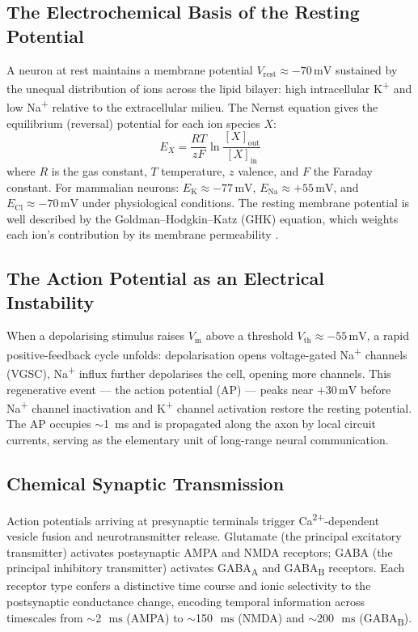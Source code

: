 \documentclass[11pt, a4paper, twocolumn]{article}
\newcommand{\Vm}{\ensuremath{V_{\mathrm{m}}}}
\newcommand{\Vrest}{\ensuremath{V_{\mathrm{rest}}}}
\newcommand{\Vth}{\ensuremath{V_{\mathrm{th}}}}
\newcommand{\EK}{\ensuremath{E_{\mathrm{K}}}}
\newcommand{\ENa}{\ensuremath{E_{\mathrm{Na}}}}
\newcommand{\ECl}{\ensuremath{E_{\mathrm{Cl}}}}
\newcommand{\mV}{\ensuremath{\,\mathrm{mV}}}
\newcommand{\ms}{\ensuremath{\,\mathrm{ms}}}
\begin{document}
\subsection{The Electrochemical Basis of the Resting Potential}

A neuron at rest maintains a membrane potential $\Vrest \approx -70\mV$
sustained by the unequal distribution of ions across the lipid bilayer:
high intracellular K\textsuperscript{+} and low Na\textsuperscript{+}
relative to the extracellular milieu. The Nernst equation gives the
equilibrium (reversal) potential for each ion species $X$:
\begin{equation}
  E_X = \frac{RT}{zF} \ln \frac{[X]_{\mathrm{out}}}{[X]_{\mathrm{in}}}
  \label{eq:nernst}
\end{equation}
where $R$ is the gas constant, $T$ temperature, $z$ valence, and $F$ the
Faraday constant. For mammalian neurons: $\EK \approx -77\mV$,
$\ENa \approx +55\mV$, and $\ECl \approx -70\mV$ under physiological conditions.
The resting membrane potential is well described by the Goldman--Hodgkin--Katz
(GHK) equation, which weights each ion's contribution by its membrane
permeability \citep{Goldman1943}.

\subsection{The Action Potential as an Electrical Instability}

When a depolarising stimulus raises $\Vm$ above a threshold
$\Vth \approx -55\mV$, a rapid positive-feedback cycle unfolds:
depolarisation opens voltage-gated Na\textsuperscript{+} channels (VGSC),
Na\textsuperscript{+} influx further depolarises the cell, opening more
channels. This regenerative event --- the action potential (AP) --- peaks near
$+30\mV$ before Na\textsuperscript{+} channel inactivation and K\textsuperscript{+}
channel activation restore the resting potential. The AP occupies
$\sim$\SI{1}{\milli\second} and is propagated along the axon by local circuit
currents, serving as the elementary unit of long-range neural communication.

\subsection{Chemical Synaptic Transmission}

Action potentials arriving at presynaptic terminals trigger
Ca\textsuperscript{2+}-dependent vesicle fusion and neurotransmitter release.
Glutamate (the principal excitatory transmitter) activates postsynaptic AMPA
and NMDA receptors; GABA (the principal inhibitory transmitter) activates
GABA\textsubscript{A} and GABA\textsubscript{B} receptors. Each receptor
type confers a distinctive time course and ionic selectivity to the
postsynaptic conductance change, encoding temporal information across
timescales from $\sim$\SI{2}{\ms} (AMPA) to $\sim$\SI{150}{\ms} (NMDA) and
$\sim$\SI{200}{\ms} (GABA\textsubscript{B}).
\end{document}
